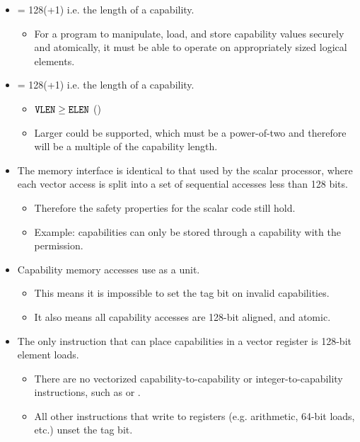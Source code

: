 \begin{itemize}
    \item {} = 128(+1) i.e. the length of a capability.
    \begin{itemize}
        \item For a program to manipulate, load, and store capability values securely and atomically, it must be able to operate on appropriately sized logical elements.
    \end{itemize}
    \item {} = 128(+1) i.e. the length of a capability.
    \begin{itemize}
        \item ${\texttt{VLEN}} \ge {\texttt{ELEN}}$ (\cite[Chapter 2]{specification-RVV-v1.0})
        \item Larger  could be supported, which must be a power-of-two\cite[Chapter 2]{specification-RVV-v1.0} and therefore will be a multiple of the capability length.
    \end{itemize}
    \item The memory interface is identical to that used by the scalar processor, where each vector access is split into a set of sequential accesses less than 128 bits.
    \begin{itemize}
        \item Therefore the safety properties for the scalar code still hold.
        \item Example: capabilities can only be stored through a capability with the  permission.
    \end{itemize}
    \item Capability memory accesses use  as a unit.
    \begin{itemize}
        \item This means it is impossible to set the tag bit on invalid capabilities.
        \item It also means all capability accesses are 128-bit aligned, and atomic.
    \end{itemize}
    \item The only instruction that can place capabilities in a vector register is 128-bit element loads.
    \begin{itemize}
        \item There are no vectorized capability-to-capability or integer-to-capability instructions, such as  or .
        \item All other instructions that write to registers (e.g. arithmetic, 64-bit loads, etc.) unset the tag bit.

\end{itemize}
\end{itemize}
